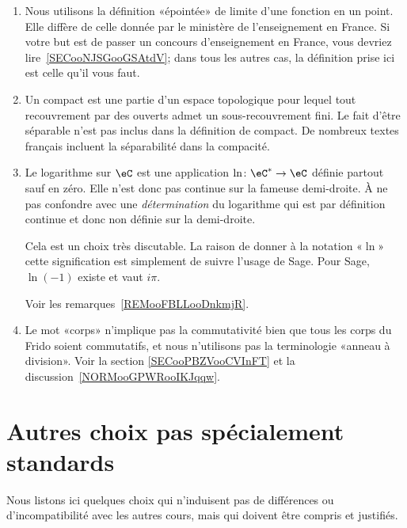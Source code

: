 \begin{enumerate}
	\item
	      Nous utilisons la définition «épointée» de limite d'une fonction en un point. Elle diffère de celle donnée par le ministère de l'enseignement en France. Si votre but est de passer un concours d'enseignement en France, vous devriez lire~\ref{SECooNJSGooGSAtdV}; dans tous les autres cas, la définition prise ici est celle qu'il vous faut.
	\item
	      Un compact est une partie d'un espace topologique pour lequel tout recouvrement par des ouverts admet un sous-recouvrement fini. Le fait d'être séparable n'est pas inclus dans la définition de compact. De nombreux textes français incluent la séparabilité dans la compacité.
	\item
	      Le logarithme sur \( \eC\) est une application \( \ln\colon \eC^*\to \eC\) définie partout sauf en zéro. Elle n'est donc pas continue sur la fameuse demi-droite. À ne pas confondre avec une \emph{détermination} du logarithme qui est par définition continue et donc non définie sur la demi-droite.

	      Cela est un choix très discutable. La raison de donner à la notation «\( \ln\)» cette signification est simplement de suivre l'usage de Sage. Pour Sage, \( \ln(-1)\) existe et vaut \( i\pi\).

	      Voir les remarques~\ref{REMooFBLLooDnkmjR}.
	\item
	      Le mot «corps» n'implique pas la commutativité bien que tous les corps du Frido soient commutatifs, et nous n'utilisons pas la terminologie «anneau à division». Voir la section \ref{SECooPBZVooCVInFT} et la discussion~\ref{NORMooGPWRooIKJqqw}.
\end{enumerate}

\section{Autres choix pas spécialement standards}

Nous listons ici quelques choix qui n'induisent pas de différences ou d'incompatibilité avec les autres cours, mais qui doivent être compris et justifiés.

